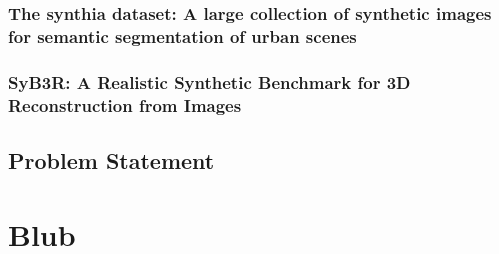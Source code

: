 \documentclass[a4paper,cleardoubleempty,BCOR1cm]{scrbook}
\begin{document}
\newpage

\subsection{The synthia dataset: A large collection of synthetic images for semantic segmentation of urban scenes}
\cite{RosCVPR16}


\newpage

\subsection{SyB3R: A Realistic Synthetic Benchmark for 3D Reconstruction from Images}
\cite{syb3r2016}







\newpage

\section{Problem Statement}



\appendix
\chapter{Blub}



\end{document}
